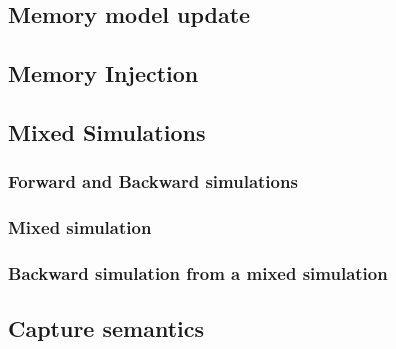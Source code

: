 
\subsection{Memory model update}
\subsection{Memory Injection}
\subsection{Mixed Simulations}
\subsubsection{Forward and Backward simulations}
\subsubsection{Mixed simulation}
\subsubsection{Backward simulation from a mixed simulation}
\subsection{Capture semantics}
